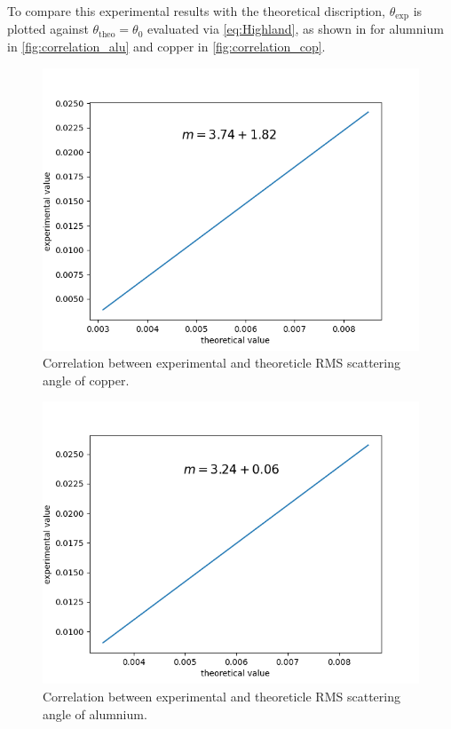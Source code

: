 \documentclass[sn-mathphys-num,iicol]{sn-jnl}
\theoremstyle{thmstyleone}
\theoremstyle{thmstyletwo}
\theoremstyle{thmstylethree}
\begin{document}
To compare this experimental results with the theoretical discription, $\theta_\text{exp}$ is plotted against $\theta_\text{theo} = \theta_0$ evaluated via \autoref{eq:Highland}, as shown in for alumnium in \autoref{fig:correlation_alu} and copper in \autoref{fig:correlation_cop}.

\begin{figure}
  \includegraphics[width=0.9\linewidth]{../src/elsa/finished_plots/Copper.png}
  \caption{Correlation between experimental and theoreticle RMS scattering angle of copper.}
  \label{fig:correlation_cop}  
\end{figure}

\begin{figure}
  \includegraphics[width=0.9\linewidth]{../src/elsa/finished_plots/Aluminium.png}
  \caption{Correlation between experimental and theoreticle RMS scattering angle of alumnium.}
  \label{fig:correlation_alu}  
\end{figure}
\end{document}
